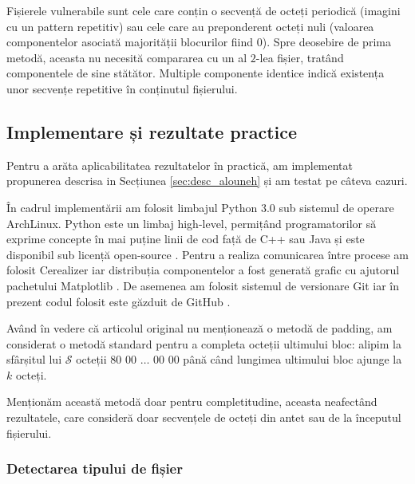 \documentclass[oneside, 12pt]{book}
\begin{document}
Fișierele vulnerabile sunt cele care conțin o secvență de octeți periodică (imagini cu un pattern repetitiv) sau cele care au preponderent octeți nuli (valoarea componentelor asociată majorității blocurilor fiind $0$). Spre deosebire de prima metodă, aceasta nu necesită compararea cu un al $2$-lea fișier, tratând componentele de sine stătător. Multiple componente identice indică existența unor secvențe repetitive în conținutul fișierului.



\subsection{Implementare și rezultate practice}
Pentru a arăta aplicabilitatea rezultatelor în practică, am implementat propunerea descrisa in Secțiunea {\ref{sec:desc_alouneh}} și am testat pe câteva cazuri.

În cadrul implementării am folosit limbajul Python 3.0 sub sistemul de operare ArchLinux. Python este un limbaj high-level, permițând programatorilor să exprime concepte în mai puține linii de cod față de C++ sau Java și este disponibil sub licență open-source \cite{Python:2015}.
Pentru a realiza comunicarea între procese am folosit Cerealizer iar distribuția componentelor a fost generată grafic cu ajutorul pachetului Matplotlib \cite{Hunter:2007, PyCerealizer:2015}. De asemenea am folosit sistemul de versionare Git iar în prezent codul folosit este găzduit de GitHub \cite{Github:2015, CodeGit:2015}.

Având în vedere că articolul original nu menționează o metodă de padding, am considerat o metodă standard pentru a completa octeții ultimului bloc: alipim la sfârșitul lui $\mathcal{S}$ octeții $80$ $00$ $\dots$ $00$ $00$ până când lungimea ultimului bloc ajunge la $k$ octeți.

Menționăm această metodă doar pentru completitudine, aceasta neafectând rezultatele, care consideră doar secvențele de octeți din antet sau de la începutul fișierului.



\subsubsection{Detectarea tipului de fișier}\hspace*{\fill} \\
\end{document}
